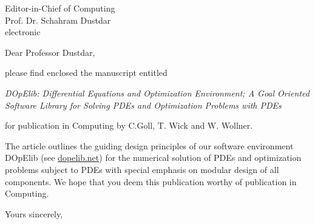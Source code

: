 \documentclass{uhhbrief-fak6}    %
\date{\today}
\begin{document}
\begin{letter}{Editor-in-Chief of Computing\\Prof. Dr. Schahram Dustdar\\[\baselineskip]
    electronic}

\subject{Paper Submission}

\opening{Dear Professor Dustdar,}

please find enclosed the manuscript entitled

{\em DOpElib: Differential Equations and Optimization Environment; A Goal Oriented Software Library for Solving PDEs and Optimization Problems with PDEs}

for publication in Computing by
C.Goll, T. Wick and W. Wollner.

The article outlines the guiding design principles of our software environment
DOpElib (see \url{dopelib.net}) for the numerical solution of PDEs and optimization problems subject 
to PDEs with special emphasis on modular design of all components. 
We hope that you deem this publication worthy of publication in Computing.

\closing{Yours sincerely,}




\end{letter}
\end{document}
